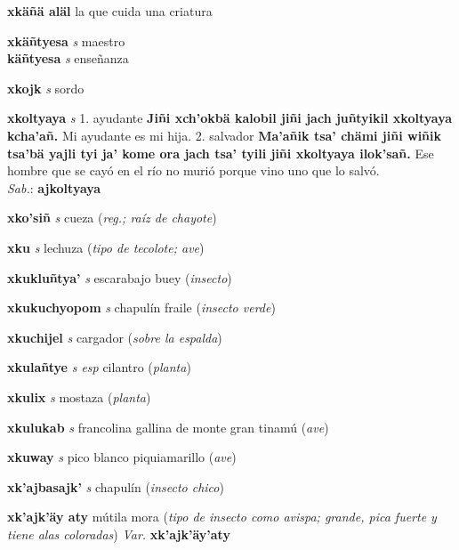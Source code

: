 \documentclass[10pt]{scrbook}
\newcommand{\entry}[1]{\textbf{#1}}
\newcommand{\onedefinition}[1]{#1.}
\newcommand{\partofspeech}[1]{\textit{#1}}
\newcommand{\spanishtranslation}[1]{#1}
\newcommand{\clarification}[1]{(\textit{#1})}
\newcommand{\cholexample}[1]{\textbf{#1}}
\newcommand{\exampletranslation}[1]{#1}
\newcommand{\dialectvariant}[1]{\\\textit{#1}:}
\newcommand{\dialectword}[1]{\textbf{#1}}
\newcommand{\secondaryentry}[1]{\\\textbf{#1}}
\newcommand{\secondpartofspeech}[1]{\textit{#1}}
\newcommand{\secondtranslation}[1]{#1}
\newcommand{\variation}[1]{\textit{Var.} \textbf{#1}}
\begin{document}
\begin{multicols}{2}
\entry{xkäñä aläl}
\spanishtranslation{la que cuida una criatura}

\entry{xkäñtyesa}
\partofspeech{s}
\spanishtranslation{maestro}
\secondaryentry{käñtyesa}
\secondpartofspeech{s}
\secondtranslation{enseñanza}

\entry{xkojk}
\partofspeech{s}
\spanishtranslation{sordo}

\entry{xkoltyaya}
\partofspeech{s}
\onedefinition{1}
\spanishtranslation{ayudante}
\cholexample{Jiñi xch'okbä kalobil jiñi jach juñtyikil xkoltyaya kcha'añ.}
\exampletranslation{Mi ayudante es mi hija.}
\onedefinition{2}
\spanishtranslation{salvador}
\cholexample{Ma'añik tsa' chämi jiñi wiñik tsa'bä yajli tyi ja' kome ora jach tsa' tyili jiñi xkoltyaya ilok'sañ.}
\exampletranslation{Ese hombre que se cayó en el río no murió porque vino uno que lo salvó.}
\dialectvariant{Sab.}
\dialectword{ajkoltyaya}

\entry{xko'siñ}
\partofspeech{s}
\spanishtranslation{cueza}
\clarification{reg.; raíz de chayote}

\entry{xku}
\partofspeech{s}
\spanishtranslation{lechuza}
\clarification{tipo de tecolote; ave}

\entry{xkukluñtya'}
\partofspeech{s}
\spanishtranslation{escarabajo buey}
\clarification{insecto}

\entry{xkukuchyopom}
\partofspeech{s}
\spanishtranslation{chapulín fraile}
\clarification{insecto verde}

\entry{xkuchijel}
\partofspeech{s}
\spanishtranslation{cargador}
\clarification{sobre la espalda}

\entry{xkulañtye}
\partofspeech{s esp}
\spanishtranslation{cilantro}
\clarification{planta}

\entry{xkulix}
\partofspeech{s}
\spanishtranslation{mostaza}
\clarification{planta}

\entry{xkulukab}
\partofspeech{s}
\spanishtranslation{francolina}
\spanishtranslation{gallina de monte}
\spanishtranslation{gran tinamú}
\clarification{ave}

\entry{xkuway}
\partofspeech{s}
\spanishtranslation{pico blanco}
\spanishtranslation{piquiamarillo}
\clarification{ave}

\entry{xk'ajbasajk'}
\partofspeech{s}
\spanishtranslation{chapulín}
\clarification{insecto chico}

\entry{xk'ajk'äy aty}
\spanishtranslation{mútila mora}
\clarification{tipo de insecto como avispa; grande, pica fuerte y tiene alas coloradas}
\variation{xk'ajk'äy'aty}


\end{multicols}
\end{document}
